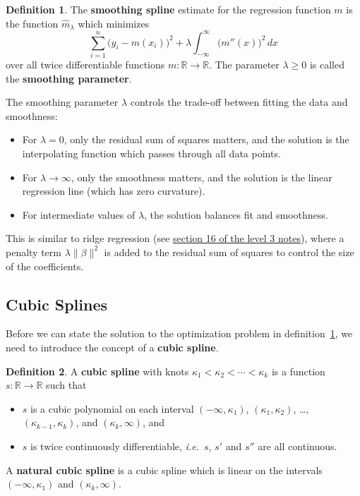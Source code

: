 \documentclass[
  a4paper,
]{article}
\providecommand{\tightlist}{%
  \setlength{\itemsep}{0pt}\setlength{\parskip}{0pt}}
\theoremstyle{definition}
\newtheorem{definition}{Definition}[section]
\theoremstyle{definition}
\theoremstyle{definition}
\theoremstyle{definition}
\theoremstyle{remark}
\begin{document}
\begin{definition}
\protect\hypertarget{def:smoothing-spline}{}\label{def:smoothing-spline}The \textbf{smoothing spline} estimate for the regression function \(m\) is the
function \(\hat m_\lambda\) which minimizes
\begin{equation}
  \sum_{i=1}^n \bigl( y_i - m(x_i) \bigr)^2 + \lambda \int_{-\infty}^\infty \bigl( m''(x) \bigr)^2 \,dx
  \label{eq:spline-penalty}
\end{equation}
over all twice differentiable functions \(m\colon \mathbb{R}\to \mathbb{R}\).
The parameter \(\lambda \geq 0\) is called the \textbf{smoothing parameter}.
\end{definition}

The smoothing parameter \(\lambda\) controls the trade-off between fitting
the data and smoothness:

\begin{itemize}
\tightlist
\item
  For \(\lambda = 0\), only the residual sum of squares matters, and the
  solution is the interpolating function which passes through all data
  points.
\item
  For \(\lambda \to \infty\), only the smoothness matters, and the solution
  is the linear regression line (which has zero curvature).
\item
  For intermediate values of \(\lambda\), the solution balances fit and
  smoothness.
\end{itemize}

This is similar to ridge regression (see \href{https://seehuhn.github.io/MATH3714/S16-ridge.html}{section 16 of the level 3
notes}), where a penalty
term \(\lambda \|\beta\|^2\) is added to the residual sum of squares to
control the size of the coefficients.

\subsection{Cubic Splines}\label{cubic-splines}

Before we can state the solution to the optimization problem in
definition~\ref{def:smoothing-spline}, we need to introduce the concept
of a \textbf{cubic spline}.

\begin{definition}
\protect\hypertarget{def:cubic-spline}{}\label{def:cubic-spline}A \textbf{cubic spline} with knots \(\kappa_1 < \kappa_2 < \cdots < \kappa_k\) is
a function \(s\colon \mathbb{R}\to \mathbb{R}\) such that

\begin{itemize}
\tightlist
\item
  \(s\) is a cubic polynomial on each interval \((-\infty, \kappa_1)\),
  \((\kappa_1, \kappa_2)\), \ldots, \((\kappa_{k-1}, \kappa_k)\), and
  \((\kappa_k, \infty)\), and
\item
  \(s\) is twice continuously differentiable, \emph{i.e.}~\(s\), \(s'\) and \(s''\)
  are all continuous.
\end{itemize}

A \textbf{natural cubic spline} is a cubic spline which is linear on the
intervals \((-\infty, \kappa_1)\) and \((\kappa_k, \infty)\).
\end{definition}
\end{document}
